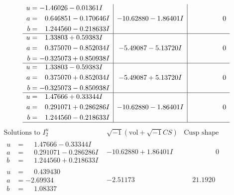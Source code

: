 \documentclass[1p]{elsarticle_modified}
\theoremstyle{definition}
\newcommand{\I}{\sqrt{-1}}
\begin{document}
$$\begin{array}{c|c|c}
\begin{aligned}
u &= -1.46026 - 0.01361 I \\
a &= \phantom{-}0.646851 - 0.170646 I \\
b &= \phantom{-}1.244560 - 0.218633 I\end{aligned}
 & -10.62880 - 1.86401 I & \phantom{-0.000000 } 0 \\ \hline\begin{aligned}
u &= \phantom{-}1.33803 + 0.59383 I \\
a &= \phantom{-}0.375070 - 0.852034 I \\
b &= -0.325073 + 0.850938 I\end{aligned}
 & -5.49087 - 5.13720 I & \phantom{-0.000000 } 0 \\ \hline\begin{aligned}
u &= \phantom{-}1.33803 - 0.59383 I \\
a &= \phantom{-}0.375070 + 0.852034 I \\
b &= -0.325073 - 0.850938 I\end{aligned}
 & -5.49087 + 5.13720 I & \phantom{-0.000000 } 0 \\ \hline\begin{aligned}
u &= \phantom{-}1.47666 + 0.33344 I \\
a &= \phantom{-}0.291071 + 0.286286 I \\
b &= \phantom{-}1.244560 - 0.218633 I\end{aligned}
 & -10.62880 - 1.86401 I & \phantom{-0.000000 } 0\\
 \hline 
 \end{array}$$\newpage$$\begin{array}{c|c|c}  
\text{Solutions to }I^u_{2}& \I (\text{vol} + \sqrt{-1}CS) & \text{Cusp shape}\\
 \hline 
\begin{aligned}
u &= \phantom{-}1.47666 - 0.33344 I \\
a &= \phantom{-}0.291071 - 0.286286 I \\
b &= \phantom{-}1.244560 + 0.218633 I\end{aligned}
 & -10.62880 + 1.86401 I & \phantom{-0.000000 } 0 \\ \hline\begin{aligned}
u &= \phantom{-}0.439430\phantom{ +0.000000I} \\
a &= -2.69934\phantom{ +0.000000I} \\
b &= \phantom{-}1.08337\phantom{ +0.000000I}\end{aligned}
 & -2.51173\phantom{ +0.000000I} & \phantom{-}21.1920\phantom{ +0.000000I} \\ \hline\begin{aligned}

\end{aligned}
\end{array}$$
\end{document}
